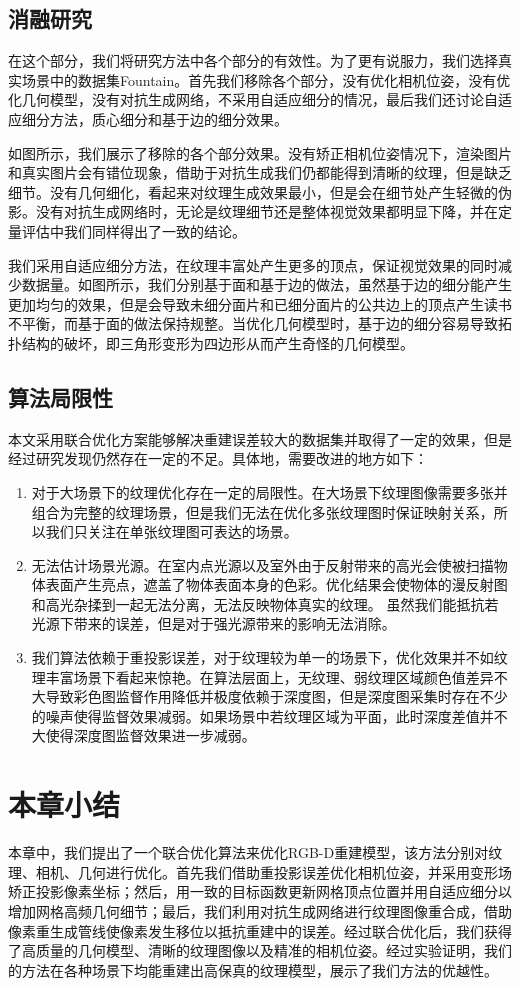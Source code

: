 \subsection{消融研究}
在这个部分，我们将研究方法中各个部分的有效性。为了更有说服力，我们选择真实场景中的数据集Fountain。首先我们移除各个部分，没有优化相机位姿，没有优化几何模型，没有对抗生成网络，不采用自适应细分的情况，最后我们还讨论自适应细分方法，质心细分和基于边的细分效果。\par
如图所示，我们展示了移除的各个部分效果。没有矫正相机位姿情况下，渲染图片和真实图片会有错位现象，借助于对抗生成我们仍都能得到清晰的纹理，但是缺乏细节。没有几何细化，看起来对纹理生成效果最小，但是会在细节处产生轻微的伪影。没有对抗生成网络时，无论是纹理细节还是整体视觉效果都明显下降，并在定量评估中我们同样得出了一致的结论。\par
我们采用自适应细分方法，在纹理丰富处产生更多的顶点，保证视觉效果的同时减少数据量。如图所示，我们分别基于面和基于边的做法，虽然基于边的细分能产生更加均匀的效果，但是会导致未细分面片和已细分面片的公共边上的顶点产生读书不平衡，而基于面的做法保持规整。当优化几何模型时，基于边的细分容易导致拓扑结构的破坏，即三角形变形为四边形从而产生奇怪的几何模型。

\subsection{算法局限性}
本文采用联合优化方案能够解决重建误差较大的数据集并取得了一定的效果，但是经过研究发现仍然存在一定的不足。具体地，需要改进的地方如下：\par
\begin{enumerate}
	\item 对于大场景下的纹理优化存在一定的局限性。在大场景下纹理图像需要多张并组合为完整的纹理场景，但是我们无法在优化多张纹理图时保证映射关系，所以我们只关注在单张纹理图可表达的场景。
	\item 无法估计场景光源。在室内点光源以及室外由于反射带来的高光会使被扫描物体表面产生亮点，遮盖了物体表面本身的色彩。优化结果会使物体的漫反射图和高光杂揉到一起无法分离，无法反映物体真实的纹理。 虽然我们能抵抗若光源下带来的误差，但是对于强光源带来的影响无法消除。
	\item 我们算法依赖于重投影误差，对于纹理较为单一的场景下，优化效果并不如纹理丰富场景下看起来惊艳。在算法层面上，无纹理、弱纹理区域颜色值差异不大导致彩色图监督作用降低并极度依赖于深度图，但是深度图采集时存在不少的噪声使得监督效果减弱。如果场景中若纹理区域为平面，此时深度差值并不大使得深度图监督效果进一步减弱。
\end{enumerate}

\section{本章小结}

本章中，我们提出了一个联合优化算法来优化RGB-D重建模型，该方法分别对纹理、相机、几何进行优化。首先我们借助重投影误差优化相机位姿，并采用变形场矫正投影像素坐标；然后，用一致的目标函数更新网格顶点位置并用自适应细分以增加网格高频几何细节；最后，我们利用对抗生成网络进行纹理图像重合成，借助像素重生成管线使像素发生移位以抵抗重建中的误差。经过联合优化后，我们获得了高质量的几何模型、清晰的纹理图像以及精准的相机位姿。经过实验证明，我们的方法在各种场景下均能重建出高保真的纹理模型，展示了我们方法的优越性。



